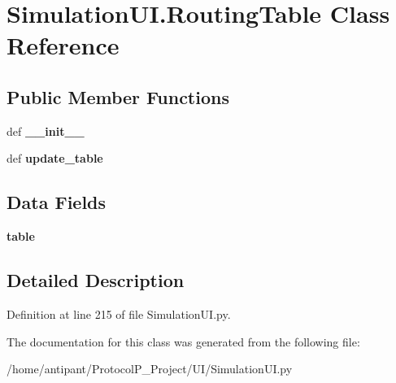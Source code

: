\hypertarget{classSimulationUI_1_1RoutingTable}{\section{Simulation\-U\-I.\-Routing\-Table Class Reference}
\label{classSimulationUI_1_1RoutingTable}
}
\subsection*{Public Member Functions}
\begin{DoxyCompactItemize}
\item 
\hypertarget{classSimulationUI_1_1RoutingTable_ac3e4dbcd347a2fc61d4f368cefc7f909}{def {\bfseries \-\_\-\-\_\-init\-\_\-\-\_\-}}\label{classSimulationUI_1_1RoutingTable_ac3e4dbcd347a2fc61d4f368cefc7f909}

\item 
\hypertarget{classSimulationUI_1_1RoutingTable_a5d3e0cc1f5b5a48c381ee9bd0cc00752}{def {\bfseries update\-\_\-table}}\label{classSimulationUI_1_1RoutingTable_a5d3e0cc1f5b5a48c381ee9bd0cc00752}

\end{DoxyCompactItemize}
\subsection*{Data Fields}
\begin{DoxyCompactItemize}
\item 
\hypertarget{classSimulationUI_1_1RoutingTable_a7fa4c188db44860d9facf2cf5ff9dbc8}{{\bfseries table}}\label{classSimulationUI_1_1RoutingTable_a7fa4c188db44860d9facf2cf5ff9dbc8}

\end{DoxyCompactItemize}


\subsection{Detailed Description}


Definition at line 215 of file Simulation\-U\-I.\-py.



The documentation for this class was generated from the following file\-:\begin{DoxyCompactItemize}
\item 
/home/antipant/\-Protocol\-P\-\_\-\-Project/\-U\-I/Simulation\-U\-I.\-py\end{DoxyCompactItemize}
